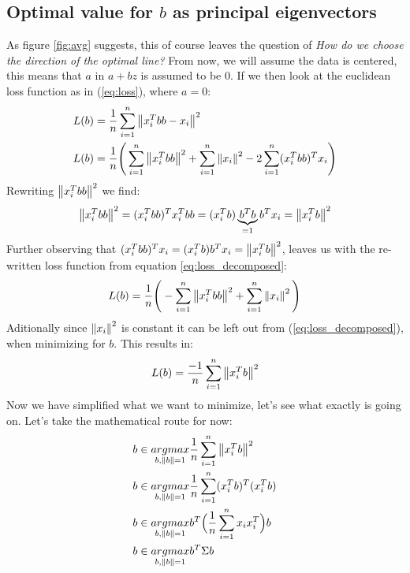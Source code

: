 \subsection{Optimal value for $b$ as principal eigenvectors}
As figure \ref{fig:avg} suggests, this of course leaves 
the question of \textit{How do we choose the direction of the optimal line?}
From now, we will assume the data is centered, this means that
$a$ in $a+bz$ is assumed to be $0$. If we then look at the 
euclidean loss function as in (\ref{eq:loss}), 
where $a=0$:
\begin{equation}
	\begin{split}
	L(b) &= \frac{1}{n}
		\sum_{i=1}^{n}\left\lVert x_i^Tbb - x_i\right\rVert^2 \\
	L(b) &= \frac{1}{n}\Bigg(
		\sum_{i=1}^{n}\left\lVert x_i^Tbb\right\rVert^2 +
		\sum_{i=1}^{n} \left\lVert x_i\right\rVert^2 - 
		2\sum_{i=1}^{n} (x_i^Tbb)^Tx_i \Bigg)\\
	\end{split}		
	\label{eq:loss_decomposed}		
\end{equation}
Rewriting $\left\lVert x_i^Tbb\right\rVert^2$ we find:
\begin{equation}
\left\lVert x_i^Tbb\right\rVert^2 = (x_i^Tbb)^Tx_i^Tbb = 
	(x_i^Tb)\underbrace{b^Tb}_{=1}b^Tx_i = \left\lVert x_i^Tb\right\rVert^2
\end{equation}
Further observing that $(x_i^Tbb)^Tx_i = (x_i^Tb)b^Tx_i = \left\lVert x_i^Tb\right\rVert^2$,
leaves us with the re-written loss function from equation
\ref{eq:loss_decomposed}:
\begin{equation}
\begin{split}
L(b) = \frac{1}{n}\Bigg(
	-\sum_{i=1}^{n}\left\lVert x_i^Tbb\right\rVert^2 +
	\sum_{i=1}^{n} \left\lVert x_i\right\rVert^2\Bigg)\\
\end{split}	
\end{equation}
Aditionally since $\left\lVert x_i\right\rVert^2$ is constant it can be 
left out from (\ref{eq:loss_decomposed}), when minimizing
for $b$. This results in:
\begin{equation}
\begin{split}
	L(b) = \frac{-1}{n}\sum_{i=1}^{n} \left\lVert x_i^Tb\right\rVert^2 \\
\end{split}			
\end{equation}
Now we have simplified what we want to minimize, let's 
see what exactly is going on. Let's take the mathematical
route for now:
			\begin{equation}
			\label{eq:sample_var}
				\begin{split}
					b&\in\underset{b,\left\lVert b\right\rVert=1}{argmax}\frac{1}{n}\sum_{i=1}^{n} \left\lVert x_i^Tb\right\rVert^2 \\
					b&\in\underset{b,\left\lVert b\right\rVert=1}{argmax}\frac{1}{n}\sum_{i=1}^{n} (x_i^Tb)^T(x_i^Tb) \\
					b&\in\underset{b,\left\lVert b\right\rVert=1}{argmax } b^T\Big(\frac{1}{n}\sum_{i=1}^{n} x_ix_i^T\Big)b \\					
					b&\in\underset{b,\left\lVert b\right\rVert=1}{argmax } b^T \Sigma b \\
				\end{split}			
			\end{equation}
